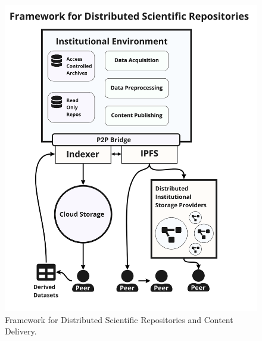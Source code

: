 \documentclass[conference]{IEEEtran}
\begin{document}
\begin{figure}[htbp]
\centering
  \includegraphics[scale=0.5]{framework.png}
  \caption{Framework for Distributed Scientific Repositories and Content Delivery.}
\end{figure}
\end{document}
